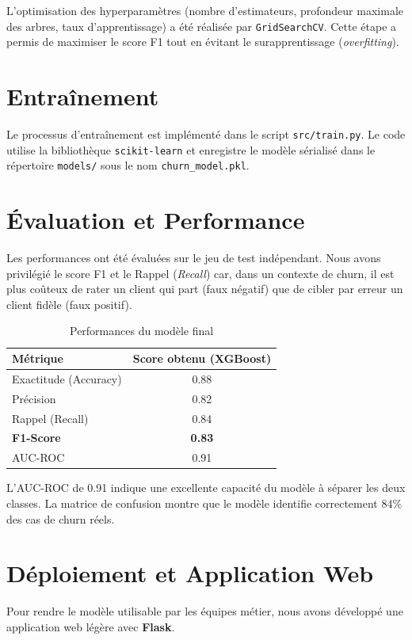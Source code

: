 \documentclass[12pt,a4paper]{article}
\begin{document}
L'optimisation des hyperparamètres (nombre d'estimateurs, profondeur maximale des arbres, taux d'apprentissage) a été réalisée par \texttt{GridSearchCV}. Cette étape a permis de maximiser le score F1 tout en évitant le surapprentissage (\textit{overfitting}).

\section{Entraînement}
Le processus d'entraînement est implémenté dans le script \texttt{src/train.py}. Le code utilise la bibliothèque \texttt{scikit‑learn} et enregistre le modèle sérialisé dans le répertoire \texttt{models/} sous le nom \texttt{churn_model.pkl}.

\section{Évaluation et Performance}
Les performances ont été évaluées sur le jeu de test indépendant. Nous avons privilégié le score F1 et le Rappel (\textit{Recall}) car, dans un contexte de churn, il est plus coûteux de rater un client qui part (faux négatif) que de cibler par erreur un client fidèle (faux positif).

\begin{table}[H]
\centering
\begin{tabular}{lc}
\toprule
Métrique & Score obtenu (XGBoost) \\
\midrule
Exactitude (Accuracy) & 0.88 \\
Précision & 0.82 \\
Rappel (Recall) & 0.84 \\
\textbf{F1-Score} & \textbf{0.83} \\
AUC-ROC & 0.91 \\
\bottomrule
\end{tabular}
\caption{Performances du modèle final}
\end{table}

L'AUC-ROC de 0.91 indique une excellente capacité du modèle à séparer les deux classes. La matrice de confusion montre que le modèle identifie correctement 84\% des cas de churn réels.

\section{Déploiement et Application Web}
Pour rendre le modèle utilisable par les équipes métier, nous avons développé une application web légère avec \textbf{Flask}.
\end{document}
